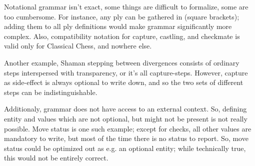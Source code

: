 \clearpage %

Notational grammar isn't exact, some things are difficult to formalize, some
are too cumbersome. For instance, any ply can be gathered in \alg{[ ]} (square
brackets); adding them to all ply definitions would make grammar significantly
more complex. Also, compatibility notation for capture, castling, and checkmate
is valid only for Classical Chess, and nowhere else.

Another example, Shaman stepping between divergences consists of ordinary steps
interspersed with transparency, or it's all capture-steps. However, capture as
side-effect is always optional to write down, and so the two sets of different
steps can be indistinguishable.

Additionaly, grammar does not have access to an external context. So, defining
entity and values which are not optional, but might not be present is not really
possible. Move status is one such example; except for checks, all other values
are mandatory to write, but most of the time there is no status to report. So,
move status could be optimized out as e.g. an optional entity; while technically
true, this would not be entirely correct.

\clearpage %
